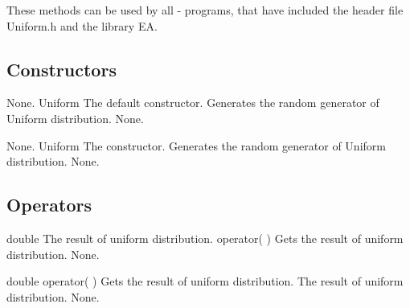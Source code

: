 \noindent
These methods can be used by all \cpp - programs, that have included the
header file Uniform.h and the library EA.

\subsection{Constructors}

\setNormalInstance
\setCorrectWidthThree{8pt}
\printMethodWithParamsSaved
{}
{None.}
{Uniform}
{The default constructor. Generates the random generator of Uniform distribution.}
{None.}
\setCorrectWidthThree{4pt}

\setNormalInstance
\setCorrectWidthThree{8pt}
\printMethodWithParamsSaved
{}
{None.}
{Uniform}
{The constructor. Generates the random generator of Uniform distribution.}
{None.}
\setCorrectWidthThree{4pt}

\vspace*{10mm}

\subsection{Operators}

\setNormalInstance
\setCorrectWidthThree{8pt}
\printMethodWithParamsSaved
{double}
{The result of uniform distribution.}
{operator( )}
{Gets the result of uniform distribution.}
{None.}
\setCorrectWidthThree{4pt}

\clearpage

\setNormalInstance
\printEmptyMethodReturnSpecial
{double}
{operator( )}
{Gets the result of uniform distribution.}
{The result of uniform distribution.}
{None.}

